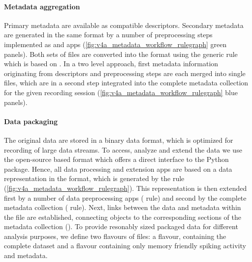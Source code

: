 \paragraph{Metadata aggregation}
Primary metadata are available as  compatible  descriptors. Secondary metadata are generated in the same format by a number of preprocessing steps implemented as  and  apps (\cref{fig:v4a_metadata_workflow_rulegraph} green panels). Both sets of  files are converted into the  format using the generic  rule which is based on . In a two level approach, first metadata information originating from descriptors and preprocessing steps are each merged into single  files, which are in a second step integrated into the complete metadata collection for the given recording session (\cref{fig:v4a_metadata_workflow_rulegraph} blue panels).

\paragraph{Data packaging}
The original data are stored in a  binary data format, which is optimized for recording of large data streams. To access, analyze and extend the data we use the open-source  based  format which offers a direct interface to the Python  package. Hence, all data processing and extension apps are based on a data representation in the  format, which is generated by the  rule (\cref{fig:v4a_metadata_workflow_rulegraph}). This representation is then extended first by a number of data preprocessing apps ( rule) and second by the complete metadata collection ( rule). Next, links between the data and metadata within the  file are established, connecting  objects to the corresponding sections of the metadata collection (). To provide resonably sized packaged data for different analysis purposes, we define two flavours of  files: a  flavour, containing the complete dataset and a  flavour containing only memory friendly spiking activity and metadata.

